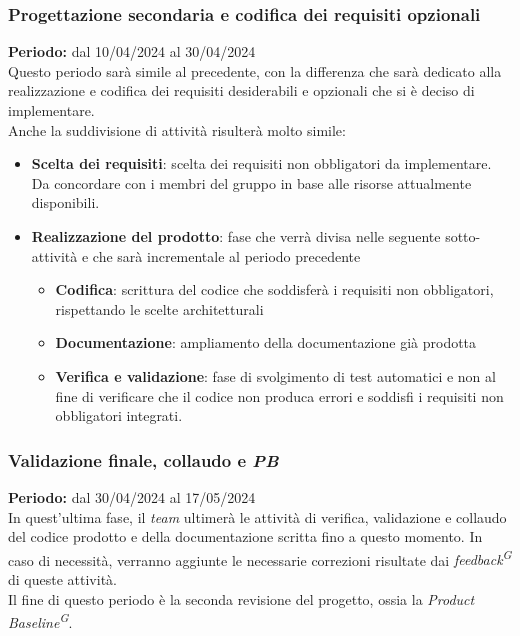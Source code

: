 \documentclass[5pt]{article}
\begin{document}
\subsubsection{Progettazione secondaria e codifica dei requisiti opzionali}
\textbf{Periodo:} dal 10/04/2024 al 30/04/2024 
\vspace{0.3cm} \\
Questo periodo sarà simile al precedente, con la differenza che sarà dedicato alla realizzazione e codifica dei requisiti desiderabili e opzionali 
che si è deciso di implementare. \\
Anche la suddivisione di attività risulterà molto simile:
\begin{itemize}
  \item \textbf{Scelta dei requisiti}: scelta dei requisiti non obbligatori da implementare. Da concordare con i membri del gruppo in base alle risorse attualmente disponibili.
  \item \textbf{Realizzazione del prodotto}: fase che verrà divisa nelle seguente sotto-attività e che sarà incrementale al periodo precedente
  \begin{itemize}
    \item \textbf{Codifica}: scrittura del codice che soddisferà i requisiti non obbligatori, rispettando le scelte architetturali
    \item \textbf{Documentazione}: ampliamento della documentazione già prodotta
    \item \textbf{Verifica e validazione}: fase di svolgimento di test automatici e non al fine di verificare che il codice non produca errori e soddisfi i requisiti non obbligatori integrati.
  \end{itemize}  
\end{itemize}

\subsubsection{Validazione finale, collaudo e \textit{PB}}
\textbf{Periodo:} dal 30/04/2024 al 17/05/2024 
\vspace{0.3cm} \\
In quest'ultima fase, il \textit{team} ultimerà le attività di verifica, validazione e collaudo del codice prodotto e della documentazione scritta fino a questo momento.
In caso di necessità, verranno aggiunte le necessarie correzioni risultate dai \textit{feedback\textsuperscript{G}} di queste attività. \\
Il fine di questo periodo è la seconda revisione del progetto, ossia la \textit{Product Baseline\textsuperscript{G}}.
\end{document}
